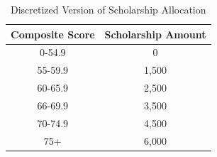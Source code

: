\documentclass[12pt,english]{report}
\begin{document}
\begin{table}[ht]
\centering
\begin{tabular}{|c|c|}
\hline
Composite Score & Scholarship Amount \\ \hline
0-54.9         & 0              \\ \hline
55-59.9         & 1,500              \\ \hline
60-65.9         & 2,500              \\ \hline
66-69.9         & 3,500              \\ \hline
70-74.9         & 4,500              \\ \hline
75+             & 6,000              \\ \hline
\end{tabular}
\caption{Discretized Version of Scholarship Allocation}
\label{money_result_discrete}

\end{table}
\end{document}
